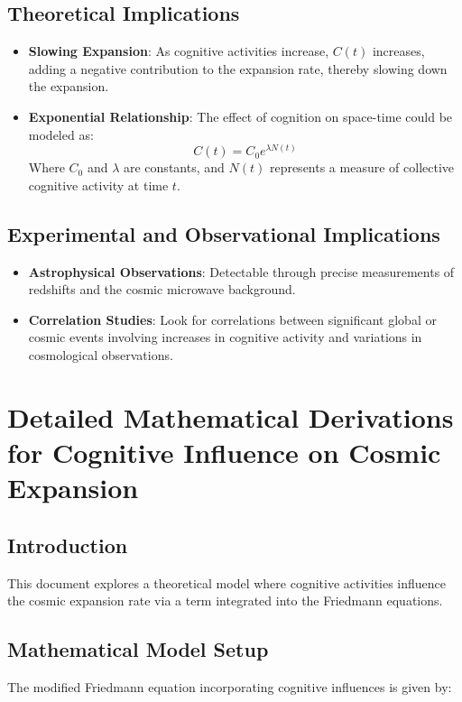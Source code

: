\documentclass{article}
\begin{document}
\subsection{Theoretical Implications}
\begin{itemize}
    \item \textbf{Slowing Expansion}: As cognitive activities increase, $C(t)$ increases, adding a negative contribution to the expansion rate, thereby slowing down the expansion.
    \item \textbf{Exponential Relationship}: The effect of cognition on space-time could be modeled as:
    \begin{equation}
    C(t) = C_0 e^{\lambda N(t)}
    \end{equation}
    Where $C_0$ and $\lambda$ are constants, and $N(t)$ represents a measure of collective cognitive activity at time $t$.
\end{itemize}

\subsection{Experimental and Observational Implications}
\begin{itemize}
    \item \textbf{Astrophysical Observations}: Detectable through precise measurements of redshifts and the cosmic microwave background.
    \item \textbf{Correlation Studies}: Look for correlations between significant global or cosmic events involving increases in cognitive activity and variations in cosmological observations.
\end{itemize}
\section{Detailed Mathematical Derivations for Cognitive Influence on Cosmic Expansion}

\subsection{Introduction}
This document explores a theoretical model where cognitive activities influence the cosmic expansion rate via a term integrated into the Friedmann equations.

\subsection{Mathematical Model Setup}
The modified Friedmann equation incorporating cognitive influences is given by:
\end{document}

